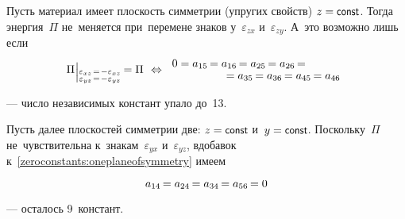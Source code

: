 \begin{otherlanguage}{russian}
Пусть материал имеет плоскость симметрии (упругих свойств) ${z = \const}$. Тогда энергия~$\Pi$ не~меняется при~перемене знаков у~$\varepsilon_{zx}$ и~$\varepsilon_{zy}$. А~это возможно лишь если
\begin{equation}\label{zeroconstants:oneplaneofsymmetry}
\Pi \hspace{0.1ex} \raisemath{-0.2em}{\Bigr\vert}_{\substack{%
\varepsilon_{xz} \hspace{0.2ex}=\hspace{0.2ex} -\varepsilon_{xz} \\
\varepsilon_{yz} \hspace{0.2ex}=\hspace{0.2ex} -\varepsilon_{yz}
}} \hspace{-0.2ex} = \Pi
\:\,\Leftrightarrow \hspace{-3em}
\begin{array}{c}
0 =
a_{15} \hspace{-0.2ex} = a_{16} \hspace{-0.2ex} = a_{25} \hspace{-0.2ex} = a_{26} \hspace{-0.2ex} = \\[-0.1em]
\hspace{8em} = a_{35} \hspace{-0.2ex} = a_{36} \hspace{-0.2ex} = a_{45} \hspace{-0.2ex} = a_{46}
\end{array}
\end{equation}

\noindent --- число независимых констант упало до~13.

Пусть далее плоскостей симметрии две: ${z = \const}$ и~${y = \const}$. Поскольку~$\Pi$ не~чувствительна к~знакам~$\varepsilon_{yx}$ и~$\varepsilon_{yz}$, вдобавок к~\eqref{zeroconstants:oneplaneofsymmetry} имеем

\nopagebreak\vspace{-1.1em}\begin{equation}\label{zeroconstants:2orthogonalplanesofsymmetry:orthotropic}
a_{14} \hspace{-0.2ex} = a_{24} \hspace{-0.2ex} = a_{34} \hspace{-0.2ex} = a_{56} \hspace{-0.2ex} = 0
\end{equation}

\vspace{-0.25em}\noindent --- осталось 9~констант.


\end{otherlanguage}
